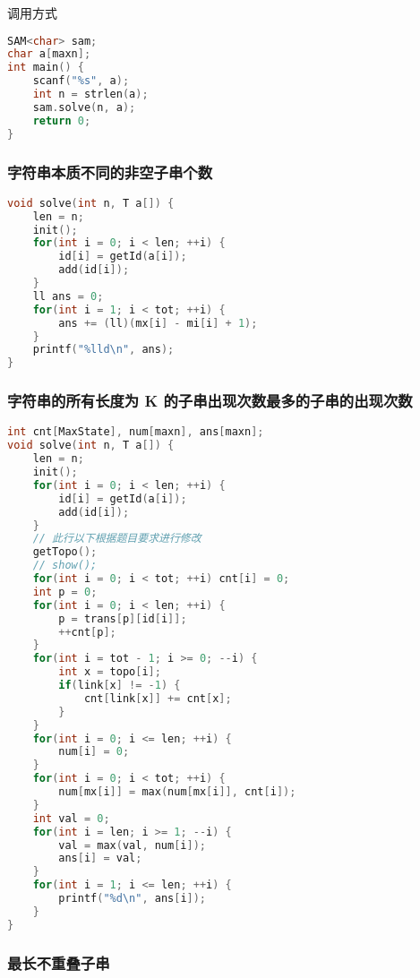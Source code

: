 调用方式

\begin{lstlisting}[language=C++]
SAM<char> sam;
char a[maxn];
int main() {
    scanf("%s", a);
    int n = strlen(a);
    sam.solve(n, a);
    return 0;
}
\end{lstlisting}

\subsubsection{字符串本质不同的非空子串个数}

\begin{lstlisting}[language=C++]
void solve(int n, T a[]) {
    len = n;
    init();
    for(int i = 0; i < len; ++i) {
        id[i] = getId(a[i]);
        add(id[i]);
    }
    ll ans = 0;
    for(int i = 1; i < tot; ++i) {
        ans += (ll)(mx[i] - mi[i] + 1);
    }
    printf("%lld\n", ans);
}
\end{lstlisting}

\subsubsection{字符串的所有长度为 K 的子串出现次数最多的子串的出现次数}

\begin{lstlisting}[language=C++]
int cnt[MaxState], num[maxn], ans[maxn];
void solve(int n, T a[]) {
    len = n;
    init();
    for(int i = 0; i < len; ++i) {
        id[i] = getId(a[i]);
        add(id[i]);
    }
    // 此行以下根据题目要求进行修改
    getTopo();
    // show();
    for(int i = 0; i < tot; ++i) cnt[i] = 0;
    int p = 0;
    for(int i = 0; i < len; ++i) {
        p = trans[p][id[i]];
        ++cnt[p];
    }
    for(int i = tot - 1; i >= 0; --i) {
        int x = topo[i];
        if(link[x] != -1) {
            cnt[link[x]] += cnt[x];
        }
    }
    for(int i = 0; i <= len; ++i) {
        num[i] = 0;
    }
    for(int i = 0; i < tot; ++i) {
        num[mx[i]] = max(num[mx[i]], cnt[i]);
    }
    int val = 0;
    for(int i = len; i >= 1; --i) {
        val = max(val, num[i]);
        ans[i] = val;
    }
    for(int i = 1; i <= len; ++i) {
        printf("%d\n", ans[i]);
    }
}
\end{lstlisting}

\subsubsection{最长不重叠子串}

